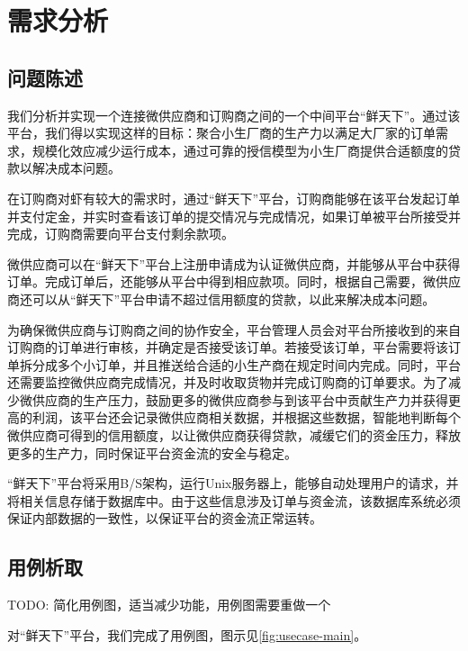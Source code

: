 \chapter{需求分析}

\label{cha:demand_analysis}
\section{问题陈述}


我们分析并实现一个连接微供应商和订购商之间的一个中间平台“鲜天下”。通过该平台，我们得以实现这样的目标：聚合小生厂商的生产力以满足大厂家的订单需求，规模化效应减少运行成本，通过可靠的授信模型为小生厂商提供合适额度的贷款以解决成本问题。

在订购商对虾有较大的需求时，通过“鲜天下”平台，订购商能够在该平台发起订单并支付定金，并实时查看该订单的提交情况与完成情况，如果订单被平台所接受并完成，订购商需要向平台支付剩余款项。

微供应商可以在“鲜天下”平台上注册申请成为认证微供应商，并能够从平台中获得订单。完成订单后，还能够从平台中得到相应款项。同时，根据自己需要，微供应商还可以从“鲜天下”平台申请不超过信用额度的贷款，以此来解决成本问题。

为确保微供应商与订购商之间的协作安全，平台管理人员会对平台所接收到的来自订购商的订单进行审核，并确定是否接受该订单。若接受该订单，平台需要将该订单拆分成多个小订单，并且推送给合适的小生产商在规定时间内完成。同时，平台还需要监控微供应商完成情况，并及时收取货物并完成订购商的订单要求。为了减少微供应商的生产压力，鼓励更多的微供应商参与到该平台中贡献生产力并获得更高的利润，该平台还会记录微供应商相关数据，并根据这些数据，智能地判断每个微供应商可得到的信用额度，以让微供应商获得贷款，减缓它们的资金压力，释放更多的生产力，同时保证平台资金流的安全与稳定。

“鲜天下”平台将采用B/S架构，运行Unix服务器上，能够自动处理用户的请求，并将相关信息存储于数据库中。由于这些信息涉及订单与资金流，该数据库系统必须保证内部数据的一致性，以保证平台的资金流正常运转。


\section{用例析取}

TODO: 简化用例图，适当减少功能，用例图需要重做一个

对“鲜天下”平台，我们完成了用例图，图示见\autoref{fig:usecase-main}。

